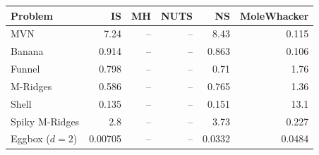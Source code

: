 \begin{tabular}{lrrrrr}
\toprule
Problem & IS & MH & NUTS & NS & MoleWhacker \\
\midrule
MVN & 7.24 & -- & -- & 8.43 & 0.115 \\
Banana & 0.914 & -- & -- & 0.863 & 0.106 \\
Funnel & 0.798 & -- & -- & 0.71 & 1.76 \\
M-Ridges & 0.586 & -- & -- & 0.765 & 1.36 \\
Shell & 0.135 & -- & -- & 0.151 & 13.1 \\
Spiky M-Ridges & 2.8 & -- & -- & 3.73 & 0.227 \\
\midrule
Eggbox ($d=2$) & 0.00705 & -- & -- & 0.0332 & 0.0484 \\
\bottomrule
\end{tabular}
